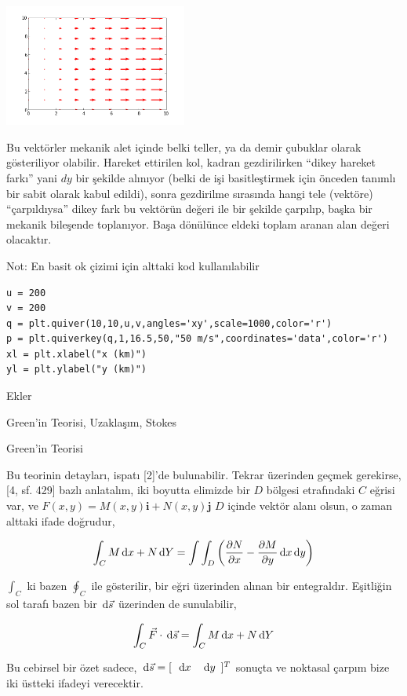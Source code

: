 \documentclass[12pt,fleqn]{article}\usepackage{../../common}
\begin{document}
\includegraphics[height=4cm]{field_x.png}

Bu vektörler mekanik alet içinde belki teller, ya da demir çubuklar olarak
gösteriliyor olabilir. Hareket ettirilen kol, kadran gezdirilirken ``dikey
hareket farkı'' yani $dy$ bir şekilde alınıyor (belki de işi basitleştirmek
için önceden tanımlı bir sabit olarak kabul edildi), sonra gezdirilme
sırasında hangi tele (vektöre) ``çarpıldıysa'' dikey fark bu vektörün
değeri ile bir şekilde çarpılıp, başka bir mekanik bileşende
toplanıyor. Başa dönülünce eldeki toplam aranan alan değeri olacaktır.

Not: En basit ok çizimi için alttaki kod kullanılabilir

\begin{verbatim}
u = 200
v = 200
q = plt.quiver(10,10,u,v,angles='xy',scale=1000,color='r')
p = plt.quiverkey(q,1,16.5,50,"50 m/s",coordinates='data',color='r')
xl = plt.xlabel("x (km)")
yl = plt.ylabel("y (km)")
\end{verbatim}

Ekler

Green'in Teorisi, Uzaklaşım, Stokes

Green'in Teorisi

Bu teorinin detayları, ispatı [2]'de bulunabilir. Tekrar üzerinden geçmek
gerekirse, [4, sf. 429] bazlı anlatalım, iki boyutta elimizde bir $D$ bölgesi
etrafındaki $C$ eğrisi var, ve $F(x,y) = M(x,y) \textbf{i} + N(x,y) \textbf{j}$
$D$ içinde vektör alanı olsun, o zaman alttaki ifade doğrudur,

$$
\int_C M \,\mathrm{d} x + N \,\mathrm{d} Y =
\int \int_D \left(
  \frac{\partial N}{\partial x} - \frac{\partial M}{\partial y}
  \,\mathrm{d} x \,\mathrm{d} y
\right)
$$

$\int_C$ ki bazen $\oint_C$ ile gösterilir, bir eğri üzerinden alınan bir
entegraldır. Eşitliğin sol tarafı bazen bir $\,\mathrm{d}\vec{s}$ üzerinden de
sunulabilir,

$$
\int_C \vec{F} \cdot \,\mathrm{d}\vec{s} = \int_C M \,\mathrm{d} x + N \,\mathrm{d} Y 
$$

Bu cebirsel bir özet sadece, $\,\mathrm{d}{\vec{s}} = [\begin{array}{cc} \,\mathrm{d} x & \,\mathrm{d} y \end{array}]^T$
sonuçta ve noktasal çarpım bize iki üstteki ifadeyi verecektir.
\end{document}
